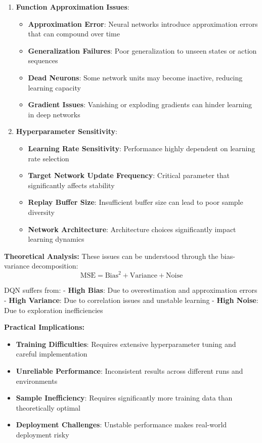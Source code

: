 \documentclass[12pt]{article}
\begin{document}
{{{\begin{enumerate}
    \item \textbf{Function Approximation Issues}:
    \begin{itemize}
        \item \textbf{Approximation Error}: Neural networks introduce approximation errors that can compound over time
        \item \textbf{Generalization Failures}: Poor generalization to unseen states or action sequences
        \item \textbf{Dead Neurons}: Some network units may become inactive, reducing learning capacity
        \item \textbf{Gradient Issues}: Vanishing or exploding gradients can hinder learning in deep networks
    \end{itemize}
    
    \item \textbf{Hyperparameter Sensitivity}:
    \begin{itemize}
        \item \textbf{Learning Rate Sensitivity}: Performance highly dependent on learning rate selection
        \item \textbf{Target Network Update Frequency}: Critical parameter that significantly affects stability
        \item \textbf{Replay Buffer Size}: Insufficient buffer size can lead to poor sample diversity
        \item \textbf{Network Architecture}: Architecture choices significantly impact learning dynamics
    \end{itemize}
\end{enumerate}

\textbf{Theoretical Analysis:}
These issues can be understood through the bias-variance decomposition:
$$\text{MSE} = \text{Bias}^2 + \text{Variance} + \text{Noise}$$

DQN suffers from:
- \textbf{High Bias}: Due to overestimation and approximation errors
- \textbf{High Variance}: Due to correlation issues and unstable learning
- \textbf{High Noise}: Due to exploration inefficiencies

\textbf{Practical Implications:}
\begin{itemize}
    \item \textbf{Training Difficulties}: Requires extensive hyperparameter tuning and careful implementation
    \item \textbf{Unreliable Performance}: Inconsistent results across different runs and environments
    \item \textbf{Sample Inefficiency}: Requires significantly more training data than theoretically optimal
    \item \textbf{Deployment Challenges}: Unstable performance makes real-world deployment risky
\end{itemize}

}}}
\end{document}

